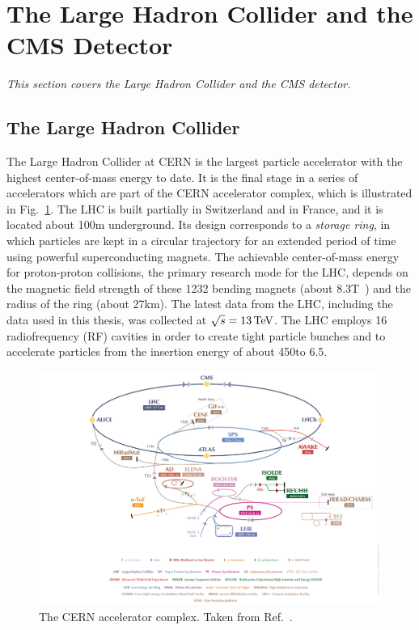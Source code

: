 \section{The Large Hadron Collider and the CMS Detector}

\emph{%
This section covers the Large Hadron Collider and the CMS detector.
% 
}


\subsection{The Large Hadron Collider}

The Large Hadron Collider at CERN is the largest particle accelerator with the highest center-of-mass energy to date.
% 
It is the final stage in a series of accelerators which are part of the CERN accelerator complex, which is illustrated in Fig.~\ref{fig:cernacceleratorcomplex}.
% 
The LHC is built partially in Switzerland and in France, and it is located about 100\unit{m} underground.
% 
Its design corresponds to a \textit{storage ring}, in which particles are kept in a circular trajectory for an extended period of time using powerful superconducting magnets.
% 
The achievable center-of-mass energy for proton-proton collisions, the primary research mode for the LHC, depends on the magnetic field strength of these 1232 bending magnets (about 8.3\unit{T}~\cite{lhc}) and the radius of the ring (about 27\unit{km}).
% 
The latest data from the LHC, including the data used in this thesis, was collected at $\sqrt{s}=13\,\text{TeV}$.
% 
The LHC employs 16 radiofrequency (RF) cavities in order to create tight particle bunches and to accelerate particles from the insertion energy of about 450\GeV to 6.5\TeV.


\begin{figure}[hbtp]
  \begin{center}
    \includegraphics[width=\linewidth]{img/detector/cernacceleratorcomplex_small.png}
    \caption{
        The CERN accelerator complex. Taken from Ref.~\cite{cernacceleratorcomplex}.
        }
    \label{fig:cernacceleratorcomplex}
  \end{center}
\end{figure}


